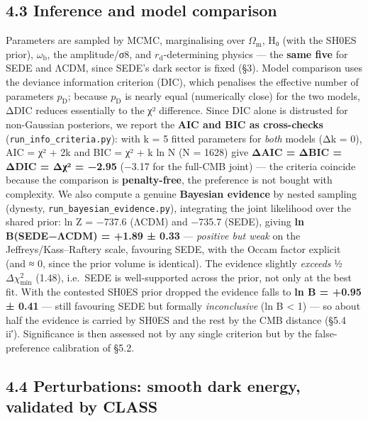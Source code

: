 \documentclass[
  10pt,
]{article}
\begin{document}
\subsection{4.3 Inference and model
comparison}\label{inference-and-model-comparison}

Parameters are sampled by MCMC, marginalising over
\(\Omega _{\mathrm{m}}\), H₀ (with the SH0ES prior),
\(\omega _{\mathrm{b}}\), the amplitude/σ8, and
\(r_{\mathrm{d}}\)-determining physics --- the \textbf{same five} for
SEDE and ΛCDM, since SEDE's dark sector is fixed (§3). Model comparison
uses the deviance information criterion (DIC), which penalises the
effective number of parameters \(p_{\mathrm{D}}\); because
\(p_{\mathrm{D}}\) is nearly equal (numerically close) for the two
models, ΔDIC reduces essentially to the χ² difference. Since DIC alone
is distrusted for non-Gaussian posteriors, we report the \textbf{AIC and
BIC as cross-checks} (\texttt{run\_info\_criteria.py}): with k = 5
fitted parameters for \emph{both} models (Δk = 0), AIC = χ² + 2k and BIC
= χ² + k ln N (N = 1628) give \textbf{ΔAIC = ΔBIC = ΔDIC = Δχ² = −2.95}
(−3.17 for the full-CMB joint) --- the criteria coincide because the
comparison is \textbf{penalty-free}, the preference is not bought with
complexity. We also compute a genuine \textbf{Bayesian evidence} by
nested sampling (dynesty, \texttt{run\_bayesian\_evidence.py}),
integrating the joint likelihood over the shared prior: ln Z = −737.6
(ΛCDM) and −735.7 (SEDE), giving \textbf{ln B(SEDE−ΛCDM) = +1.89 ± 0.33}
--- \emph{positive but weak} on the Jeffreys/Kass--Raftery scale,
favouring SEDE, with the Occam factor explicit (and ≈ 0, since the prior
volume is identical). The evidence slightly \emph{exceeds}
½\(\Delta \chi ^{2}_{\mathrm{min}}\) (1.48), i.e.~SEDE is well-supported
across the prior, not only at the best fit. With the contested SH0ES
prior dropped the evidence falls to \textbf{ln B = +0.95 ± 0.41} ---
still favouring SEDE but formally \emph{inconclusive} (\textbar ln
B\textbar{} \textless{} 1) --- so about half the evidence is carried by
SH0ES and the rest by the CMB distance (§5.4 ii′). Significance is then
assessed not by any single criterion but by the false-preference
calibration of §5.2.

\subsection{4.4 Perturbations: smooth dark energy, validated by
CLASS}\label{perturbations-smooth-dark-energy-validated-by-class}
\end{document}
